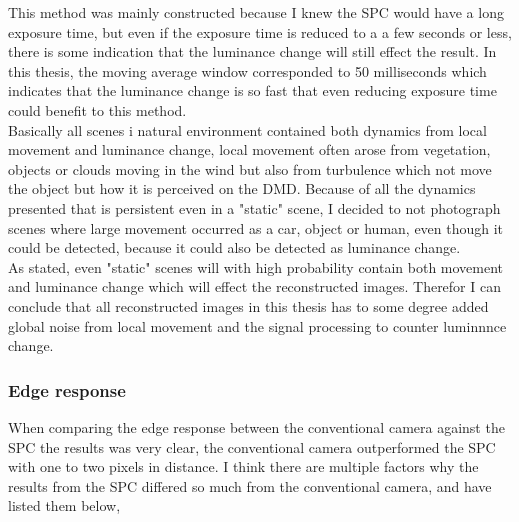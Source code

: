 This method was mainly constructed because I knew the SPC would have a long exposure time, but even if the exposure time is reduced to a a few seconds or less, there is some indication that the luminance change will still effect the result. In this thesis, the moving average window corresponded to 50 milliseconds which indicates that the luminance change is so fast that even reducing exposure time could benefit to this method.\\[0.1in]


Basically all scenes i natural environment contained both dynamics from local movement and luminance change, local movement often arose from vegetation, objects or clouds moving in the wind but also from turbulence which not move the object but how it is perceived on the DMD. Because of all the dynamics presented that is persistent even in a "static" scene, I decided to not photograph scenes where large movement occurred as a car, object or human, even though it could be detected, because it could also be detected as luminance change.\\[0.1in]

As stated, even "static" scenes will with high probability contain both movement and luminance change which will effect the reconstructed images. Therefor I can conclude that all reconstructed images in this thesis has to some degree added global noise from local movement and the signal processing to counter luminnnce change.


\subsubsection{Edge response}
When comparing the edge response between the conventional camera against the SPC the results was very clear, the conventional camera outperformed the SPC with one to two pixels in distance. I think there are multiple factors why the results from the SPC differed so much from the conventional camera, and have listed them below,

